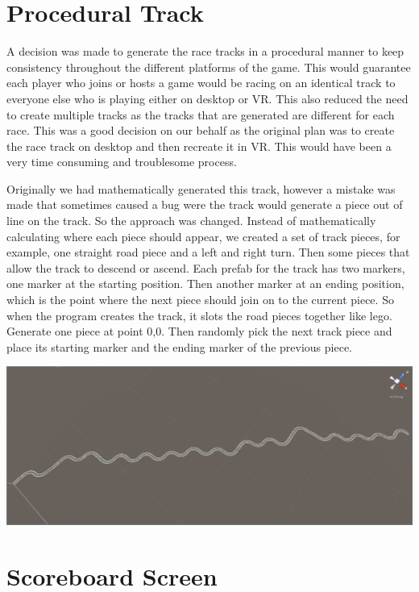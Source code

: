 \section{Procedural Track}
A decision was made to generate the race tracks in a procedural manner to keep consistency throughout the different platforms of the game. This would guarantee each player who joins or hosts a game would be racing on an identical track to everyone else who is playing either on desktop or VR. This also reduced the need to create multiple tracks as the tracks that are generated are different for each race. This was a good decision on our behalf as the original plan was to create the race track on desktop and then recreate it in VR. This would have been a very time consuming and troublesome process.\newline

Originally we had mathematically generated this track, however a mistake was made that sometimes caused a bug were the track would generate a piece out of line on the track. So the approach was changed. Instead of mathematically calculating where each piece should appear, we created a set of track pieces, for example, one straight road piece and a left and right turn. Then some pieces that allow the track to descend or ascend. Each prefab for the track has two markers, one marker at the starting position. Then another marker at an ending position, which is the point where the next piece should join on to the current piece. So when the program creates the track, it slots the road pieces together like lego. Generate one piece at point 0,0. Then randomly pick the next track piece and place its starting marker and the ending marker of the previous piece.\newline

\includegraphics[width=1\columnwidth]{img/ProceduralTrack1.PNG}


\section{Scoreboard Screen}

